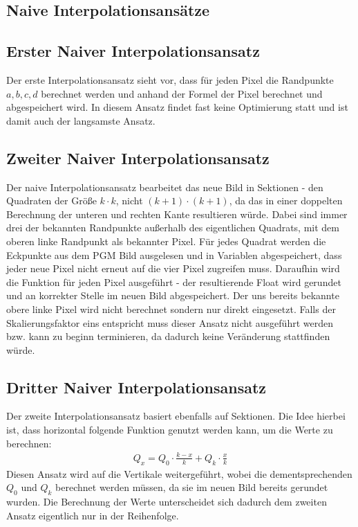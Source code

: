 \documentclass[course=erap]{aspdoc}
\begin{document}
\subsection{Naive Interpolationsansätze}

\subsection{Erster Naiver Interpolationsansatz}
Der erste Interpolationsansatz sieht vor, dass für jeden Pixel die Randpunkte $a, b, c, d$ berechnet werden und anhand der Formel der Pixel berechnet und abgespeichert wird. In diesem Ansatz findet fast keine Optimierung statt und ist damit auch der langsamste Ansatz.

\subsection{Zweiter Naiver Interpolationsansatz}
Der naive Interpolationsansatz bearbeitet das neue Bild in Sektionen - den Quadraten der Größe $k \cdot k$, nicht $(k+1) \cdot (k+1)$, da das in einer doppelten Berechnung der unteren und rechten Kante resultieren würde. Dabei sind immer drei der bekannten Randpunkte außerhalb des eigentlichen Quadrats, mit dem oberen linke Randpunkt als bekannter Pixel. Für jedes Quadrat werden die Eckpunkte aus dem PGM Bild ausgelesen und in Variablen abgespeichert, dass jeder neue Pixel nicht erneut auf die vier Pixel zugreifen muss. Daraufhin wird die Funktion für jeden Pixel ausgeführt - der resultierende Float wird gerundet und an korrekter Stelle im neuen Bild abgespeichert. Der uns bereits bekannte obere linke Pixel wird nicht berechnet sondern nur direkt eingesetzt. Falls der Skalierungsfaktor eins entspricht muss dieser Ansatz nicht ausgeführt werden bzw. kann zu beginn terminieren, da dadurch keine Veränderung stattfinden würde.

\subsection{Dritter Naiver Interpolationsansatz}
Der zweite Interpolationsansatz basiert ebenfalls auf Sektionen. Die Idee hierbei ist, dass horizontal folgende Funktion genutzt werden kann, um die Werte zu berechnen:
\begin{align}
    Q_{x} {=} Q_{0} \cdot \frac{k-x}{k} + Q_{k} \cdot \frac{x}{k}
\end{align}
Diesen Ansatz wird auf die Vertikale weitergeführt, wobei die dementsprechenden $Q_{0}$ und $Q_{k}$ berechnet werden müssen, da sie im neuen Bild bereits gerundet wurden. Die Berechnung der Werte unterscheidet sich dadurch dem zweiten Ansatz eigentlich nur in der Reihenfolge.
\end{document}
